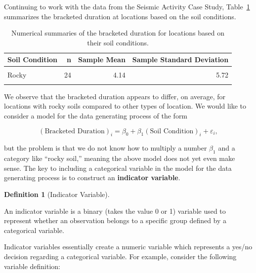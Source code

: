 \documentclass[
  letterpaper,
  DIV=11,
  numbers=noendperiod]{scrreprt}
\theoremstyle{definition}
\newtheorem{definition}{Definition}[chapter]
\theoremstyle{definition}
\theoremstyle{plain}
\theoremstyle{remark}
\begin{document}
Continuing to work with the data from the Seismic Activity Case Study,
Table~\ref{tbl-regextensions-soil} summarizes the bracketed duration at
locations based on the soil conditions.

\hypertarget{tbl-regextensions-soil}{}
\begin{table}
\caption{\label{tbl-regextensions-soil}Numerical summaries of the bracketed duration for locations based on
their soil conditions. }\tabularnewline

\centering
\begin{tabular}[t]{lrrr}
\toprule
Soil Condition & n & Sample Mean & Sample Standard Deviation\\
\midrule
\cellcolor{gray!6}{Intermediate} & \cellcolor{gray!6}{43} & \cellcolor{gray!6}{5.16} & \cellcolor{gray!6}{4.52}\\
Rocky & 24 & 4.14 & 5.72\\
\cellcolor{gray!6}{Soft} & \cellcolor{gray!6}{52} & \cellcolor{gray!6}{5.86} & \cellcolor{gray!6}{6.73}\\
\bottomrule
\end{tabular}
\end{table}

We observe that the bracketed duration appears to differ, on average,
for locations with rocky soils compared to other types of location. We
would like to consider a model for the data generating process of the
form

\[(\text{Bracketed Duration})_i = \beta_0 + \beta_1 (\text{Soil Condition})_i + \varepsilon_i,\]

but the problem is that we do not know how to multiply a number
\(\beta_1\) and a category like ``rocky soil,'' meaning the above model
does not yet even make sense. The key to including a categorical
variable in the model for the data generating process is to construct an
\textbf{indicator variable}.

\begin{definition}[Indicator
Variable]\protect\hypertarget{def-indicator-variable}{}\label{def-indicator-variable}

An indicator variable is a binary (takes the value 0 or 1) variable used
to represent whether an observation belongs to a specific group defined
by a categorical variable.

\end{definition}

Indicator variables essentially create a numeric variable which
represents a yes/no decision regarding a categorical variable. For
example, consider the following variable definition:
\end{document}
